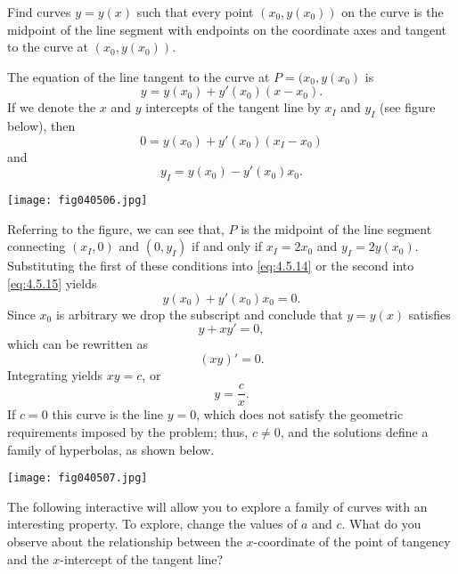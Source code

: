 \documentclass{ximera}
\begin{document}
\begin{example}\label{example:4.5.7}
Find curves $y=y(x)$ such that every point $(x_0,y(x_0))$ on the curve
is the midpoint of the line segment with endpoints on the coordinate
axes and tangent to the curve at $(x_0,y(x_0))$.
 
\begin{explanation}
 The equation of the  line tangent to the curve at $P=(x_0,y(x_0)$ is
$$
y=y(x_0)+y'(x_0)(x-x_0).
$$
If we denote the $x$ and $y$ intercepts of the tangent line by $x_I$
and $y_I$ (see figure below), then
\begin{equation} \label{eq:4.5.14}
0=y(x_0)+y'(x_0)(x_I-x_0)
\end{equation}
 and
\begin{equation} \label{eq:4.5.15}
y_I=y(x_0)-y'(x_0)x_0.
\end{equation}
 
\begin{image}
  \texttt{[image: fig040506.jpg]}
\end{image}
 
Referring to the figure, we can see that, $P$ is the midpoint of the line segment
connecting $(x_I,0)$ and $(0,y_I)$ if and only if $x_I=2x_0$ and
$y_I=2y(x_0)$. Substituting the first of these conditions into
\eqref{eq:4.5.14} or the second into \eqref{eq:4.5.15} yields
$$
y(x_0)+y'(x_0)x_0=0.
$$
Since $x_0$ is arbitrary we drop the subscript and conclude that
$y=y(x)$  satisfies
$$
y+xy'=0,
$$
which can be rewritten as
$$
(xy)'=0.
$$
Integrating  yields $xy=c$,  or
$$
y=\frac{c}{x}.
$$
If $c=0$ this curve is the line $y=0$, which does not satisfy the
geometric requirements imposed by the problem;   thus, $c\neq 0$, and the
solutions define a family of hyperbolas, as shown below.
 
\begin{image}
  \texttt{[image: fig040507.jpg]}
\end{image}
 
\end{explanation}
\end{example}

The following interactive will allow you to explore a family of curves with an interesting property.  To explore, change the values of $a$ and $c$.  What do you observe about the relationship between the $x$-coordinate of the point of tangency and the $x$-intercept of the tangent line?

\begin{center}  
\end{center}
\end{document}
